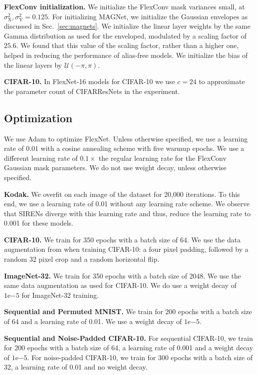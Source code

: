 \documentclass{article} \usepackage{iclr2022_conference,times}
\def\gU{{\mathcal{U}}}
\def\Xt{\mathrm{X}}
\def\Yt{\mathrm{Y}}
\def\gU{{\mathcal{U}}}
\begin{document}
\textbf{FlexConv initialization.} We initialize the FlexConv mask variances small, at $\sigma^2_{\Xt}, \sigma^2_{\Yt} = 0.125$. For initializing MAGNet, we initialize the Gaussian envelopes as discussed in Sec.~\ref{sec:magnets}. We initialize the linear layer weights by the same Gamma distribution as used for the enveloped, modulated by a scaling factor of $25.6$. We found that this value of the scaling factor, rather than a higher one, helped in reducing the performance of alias-free models. We initialize the bias of the linear layers by $\gU(- \pi,  \pi)$.

\textbf{CIFAR-10.} In FlexNet-16 models for CIFAR-10 we use $c = 24$ to approximate the parameter count of CIFARResNets in the experiment.

\subsection{Optimization}
\label{sec:flexnet-optimization}

We use Adam \citep{kingma2014adam} to optimize FlexNet. Unless otherwise specified, we use a learning rate of $0.01$ with a cosine annealing scheme \citep{loshchilov2016sgdr} with five warmup epochs. We use a different learning rate of $0.1\times$ the regular learning rate for the FlexConv Gaussian mask parameters. We do not use weight decay, unless otherwise specified.

\textbf{Kodak.} We overfit on each image of the dataset for 20,000 iterations. To this end, we use a learning rate of 0.01 without any learning rate scheme. We observe that SIRENs diverge with this learning rate and thus, reduce the learning rate to 0.001 for these models.

\textbf{CIFAR-10.} We train for 350 epochs with a batch size of 64. We use the data augmentation from \citet{he2016deep} when training CIFAR-10: a four pixel padding, followed by a random 32 pixel crop and a random horizontal flip.

\textbf{ImageNet-32.} We train for 350 epochs with a batch size of 2048. We use the same data augmentation as used for CIFAR-10. We do use a weight decay of $1\mathrm{e}{-5}$ for ImageNet-32 training.

\textbf{Sequential and Permuted MNIST.} We train for 200 epochs with a batch size of 64 and a learning rate of 0.01. We use a weight decay of $1\mathrm{e}{-5}$.

\textbf{Sequential and Noise-Padded CIFAR-10.} For sequential CIFAR-10, we train for 200 epochs with a batch size of 64, a learning rate of 0.001 and a weight decay of $1\mathrm{e}{-5}$. For noise-padded CIFAR-10, we train for 300 epochs with a batch size of 32, a learning rate of 0.01 and no weight decay.
\end{document}

